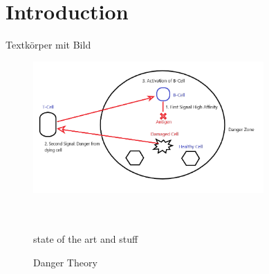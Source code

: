 %
%
% 
% 
% 


\chapter{Introduction}
\label{chap:intro}

Textkörper mit Bild

\begin{figure}[htbp]
	\centering
		\includegraphics[height=5cm]{images/DT}
	\caption{Danger Theory}
	\label{fig:buecher}\\\\
	state of the art and stuff
\end{figure}



